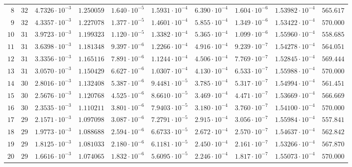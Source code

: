 {\begin{longtable}{@{}rrrrrrrrrr@{}}
$8$ & $32$ & $4.7326\cdot10^{-3}$ & $1.250059$ & $1.640\cdot10^{-5}$ & $1.5931\cdot10^{-4}$ & $6.390\cdot10^{-4}$ & $1.604\cdot10^{-6}$ & $1.53982\cdot10^{-4}$ & $565.617$\\
$9$ & $32$ & $4.3357\cdot10^{-3}$ & $1.227078$ & $1.377\cdot10^{-5}$ & $1.4601\cdot10^{-4}$ & $5.855\cdot10^{-4}$ & $1.349\cdot10^{-6}$ & $1.53422\cdot10^{-4}$ & $570.000$\\
$10$ & $31$ & $3.9723\cdot10^{-3}$ & $1.199323$ & $1.120\cdot10^{-5}$ & $1.3382\cdot10^{-4}$ & $5.365\cdot10^{-4}$ & $1.099\cdot10^{-6}$ & $1.55960\cdot10^{-4}$ & $558.685$\\
$11$ & $31$ & $3.6398\cdot10^{-3}$ & $1.181348$ & $9.397\cdot10^{-6}$ & $1.2266\cdot10^{-4}$ & $4.916\cdot10^{-4}$ & $9.239\cdot10^{-7}$ & $1.54278\cdot10^{-4}$ & $564.051$\\
$12$ & $31$ & $3.3356\cdot10^{-3}$ & $1.165116$ & $7.891\cdot10^{-6}$ & $1.1244\cdot10^{-4}$ & $4.506\cdot10^{-4}$ & $7.769\cdot10^{-7}$ & $1.52845\cdot10^{-4}$ & $569.444$\\
$13$ & $31$ & $3.0570\cdot10^{-3}$ & $1.150429$ & $6.627\cdot10^{-6}$ & $1.0307\cdot10^{-4}$ & $4.130\cdot10^{-4}$ & $6.533\cdot10^{-7}$ & $1.55988\cdot10^{-4}$ & $570.000$\\
$14$ & $30$ & $2.8016\cdot10^{-3}$ & $1.132408$ & $5.387\cdot10^{-6}$ & $9.4481\cdot10^{-5}$ & $3.785\cdot10^{-4}$ & $5.317\cdot10^{-7}$ & $1.54994\cdot10^{-4}$ & $561.451$\\
$15$ & $30$ & $2.5676\cdot10^{-3}$ & $1.120768$ & $4.525\cdot10^{-6}$ & $8.6610\cdot10^{-5}$ & $3.469\cdot10^{-4}$ & $4.471\cdot10^{-7}$ & $1.53669\cdot10^{-4}$ & $566.669$\\
$16$ & $30$ & $2.3535\cdot10^{-3}$ & $1.110211$ & $3.801\cdot10^{-6}$ & $7.9403\cdot10^{-5}$ & $3.180\cdot10^{-4}$ & $3.760\cdot10^{-7}$ & $1.54100\cdot10^{-4}$ & $570.000$\\
$17$ & $29$ & $2.1571\cdot10^{-3}$ & $1.097098$ & $3.087\cdot10^{-6}$ & $7.2791\cdot10^{-5}$ & $2.915\cdot10^{-4}$ & $3.056\cdot10^{-7}$ & $1.55984\cdot10^{-4}$ & $557.841$\\
$18$ & $29$ & $1.9773\cdot10^{-3}$ & $1.088688$ & $2.594\cdot10^{-6}$ & $6.6733\cdot10^{-5}$ & $2.672\cdot10^{-4}$ & $2.570\cdot10^{-7}$ & $1.54637\cdot10^{-4}$ & $562.842$\\
$19$ & $29$ & $1.8125\cdot10^{-3}$ & $1.081033$ & $2.180\cdot10^{-6}$ & $6.1181\cdot10^{-5}$ & $2.450\cdot10^{-4}$ & $2.161\cdot10^{-7}$ & $1.53266\cdot10^{-4}$ & $567.870$\\
$20$ & $29$ & $1.6616\cdot10^{-3}$ & $1.074065$ & $1.832\cdot10^{-6}$ & $5.6095\cdot10^{-5}$ & $2.246\cdot10^{-4}$ & $1.817\cdot10^{-7}$ & $1.55073\cdot10^{-4}$ & $570.000$\\

\end{longtable}}
